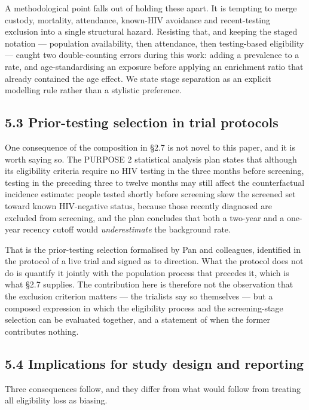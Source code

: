 A methodological point falls out of holding these apart. It is tempting to merge custody, mortality, attendance, known-HIV avoidance and recent-testing exclusion into a single structural hazard. Resisting that, and keeping the staged notation --- population availability, then attendance, then testing-based eligibility --- caught two double-counting errors during this work: adding a prevalence to a rate, and age-standardising an exposure before applying an enrichment ratio that already contained the age effect. We state stage separation as an explicit modelling rule rather than a stylistic preference.

\subsection{5.3 Prior-testing selection in trial protocols}

One consequence of the composition in §2.7 is not novel to this paper, and it is worth saying so. The PURPOSE 2 statistical analysis plan states that although its eligibility criteria require no HIV testing in the three months before screening, testing in the preceding three to twelve months may still affect the counterfactual incidence estimate: people tested shortly before screening skew the screened set toward known HIV-negative status, because those recently diagnosed are excluded from screening, and the plan concludes that both a two-year and a one-year recency cutoff would \emph{underestimate} the background rate.

That is the prior-testing selection formalised by Pan and colleagues, identified in the protocol of a live trial and signed as to direction. What the protocol does not do is quantify it jointly with the population process that precedes it, which is what §2.7 supplies. The contribution here is therefore not the observation that the exclusion criterion matters --- the trialists say so themselves --- but a composed expression in which the eligibility process and the screening-stage selection can be evaluated together, and a statement of when the former contributes nothing.

\subsection{5.4 Implications for study design and reporting}

Three consequences follow, and they differ from what would follow from treating all eligibility loss as biasing.

